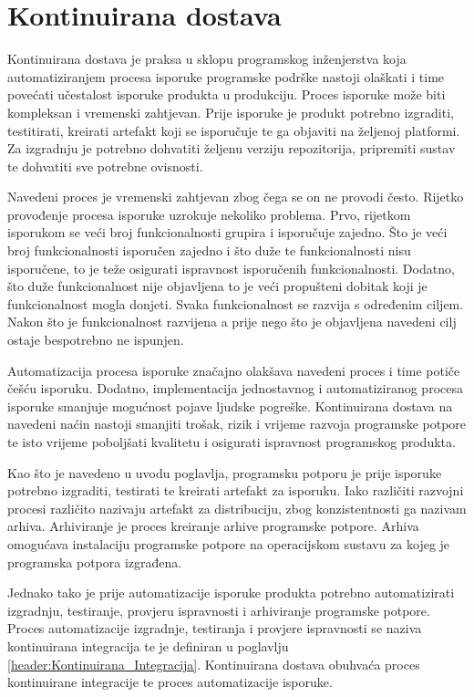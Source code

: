 \documentclass[times, utf8, diplomski, numeric]{fer}
\begin{document}
\chapter{Kontinuirana dostava}

Kontinuirana dostava je praksa u sklopu programskog inženjerstva koja automatiziranjem procesa isporuke programske podrške nastoji olaškati i time povećati učestalost isporuke produkta u produkciju. Proces isporuke može biti kompleksan i vremenski zahtjevan. Prije isporuke je produkt potrebno izgraditi, testitirati, kreirati artefakt koji se isporučuje te ga objaviti na željenoj platformi. Za izgradnju je potrebno dohvatiti željenu verziju repozitorija, pripremiti sustav te dohvatiti sve potrebne ovisnosti.

Navedeni proces je vremenski zahtjevan zbog čega se on ne provodi često. Rijetko provođenje procesa isporuke uzrokuje nekoliko problema. Prvo, rijetkom isporukom se veći broj funkcionalnosti grupira i isporučuje zajedno. Što je veći broj funkcionalnosti isporučen zajedno i što duže te funkcionalnosti nisu isporučene, to je teže osigurati ispravnost isporučenih funkcionalnosti. Dodatno, što duže funkcionalnost nije objavljena to je veći propušteni dobitak koji je funkcionalnost mogla donjeti. Svaka funkcionalnost se razvija s određenim ciljem. Nakon što je funkcionalnost razvijena a prije nego što je objavljena navedeni cilj ostaje bespotrebno ne ispunjen.

Automatizacija procesa isporuke značajno olakšava navedeni proces i time potiče češću isporuku. Dodatno, implementacija jednostavnog i automatiziranog procesa isporuke smanjuje mogućnost pojave ljudske pogreške. Kontinuirana dostava na navedeni naćin nastoji smanjiti trošak, rizik i vrijeme razvoja programske potpore te isto vrijeme poboljšati kvalitetu i osigurati ispravnost programskog produkta\citep{wiki:ContinuousDelivery}.

Kao što je navedeno u uvodu poglavlja, programsku potporu je prije isporuke potrebno izgraditi, testirati te kreirati artefakt za isporuku. Iako različiti razvojni procesi različito nazivaju artefakt za distribuciju, zbog konzistentnosti ga nazivam arhiva. Arhiviranje je proces kreiranje arhive programske potpore. Arhiva omogućava instalaciju programske potpore na operacijskom sustavu za kojeg je programska potpora izgrađena.

Jednako tako je prije automatizacije isporuke produkta potrebno automatizirati izgradnju, testiranje, provjeru ispravnosti i arhiviranje programske potpore. Proces automatizacije izgradnje, testiranja i provjere ispravnosti se naziva kontinuirana integracija te je definiran u poglavlju \ref{header:Kontinuirana_Integracija}. Kontinuirana dostava obuhvaća proces kontinuirane integracije te proces automatizacije isporuke.
\end{document}
